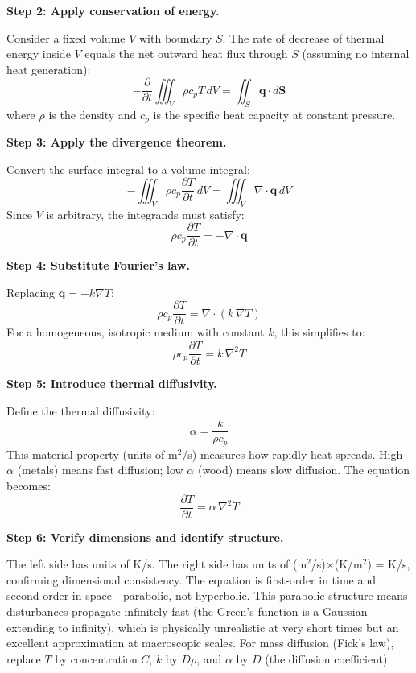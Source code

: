 \textbf{Step 2: Apply conservation of energy.}

Consider a fixed volume $V$ with boundary $S$. The rate of decrease of thermal energy inside $V$ equals the net outward heat flux through $S$ (assuming no internal heat generation):
\begin{equation}
-\frac{\partial}{\partial t}\iiint_V \rho c_p T\, dV = \iint_S \mathbf{q} \cdot d\mathbf{S}
\end{equation}
where $\rho$ is the density and $c_p$ is the specific heat capacity at constant pressure.

\textbf{Step 3: Apply the divergence theorem.}

Convert the surface integral to a volume integral:
\begin{equation}
-\iiint_V \rho c_p \frac{\partial T}{\partial t}\, dV = \iiint_V \nabla \cdot \mathbf{q}\, dV
\end{equation}
Since $V$ is arbitrary, the integrands must satisfy:
\begin{equation}
\rho c_p \frac{\partial T}{\partial t} = -\nabla \cdot \mathbf{q}
\end{equation}

\textbf{Step 4: Substitute Fourier's law.}

Replacing $\mathbf{q} = -k\nabla T$:
\begin{equation}
\rho c_p \frac{\partial T}{\partial t} = \nabla \cdot (k\,\nabla T)
\end{equation}
For a homogeneous, isotropic medium with constant $k$, this simplifies to:
\begin{equation}
\rho c_p \frac{\partial T}{\partial t} = k\,\nabla^2 T
\end{equation}

\textbf{Step 5: Introduce thermal diffusivity.}

Define the thermal diffusivity:
\begin{equation}
\alpha = \frac{k}{\rho c_p}
\end{equation}
This material property (units of m$^2$/s) measures how rapidly heat spreads. High $\alpha$ (metals) means fast diffusion; low $\alpha$ (wood) means slow diffusion. The equation becomes:
\begin{equation}
\frac{\partial T}{\partial t} = \alpha\,\nabla^2 T
\end{equation}

\textbf{Step 6: Verify dimensions and identify structure.}

The left side has units of K/s. The right side has units of (m$^2$/s)$\times$(K/m$^2$) = K/s, confirming dimensional consistency. The equation is first-order in time and second-order in space---parabolic, not hyperbolic. This parabolic structure means disturbances propagate infinitely fast (the Green's function is a Gaussian extending to infinity), which is physically unrealistic at very short times but an excellent approximation at macroscopic scales. For mass diffusion (Fick's law), replace $T$ by concentration $C$, $k$ by $D\rho$, and $\alpha$ by $D$ (the diffusion coefficient).

